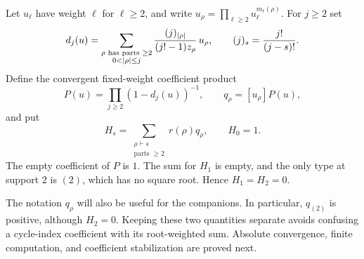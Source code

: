 Let $u_\ell$ have weight $\ell$ for $\ell\geq2$, and write $u_\rho=\prod_{\ell\geq2}u_\ell^{m_\ell(\rho)}$. For $j\geq2$ set
\begin{equation}\label{tks:eq:dj}
d_j(u)=\sum_{\substack{\rho\text{ has parts }\geq2\\0<|\rho|\leq j}}
 \frac{\fall{j}{|\rho|}}{(j!-1)z_\rho}\,u_\rho,
\qquad \fall{j}{s}=\frac{j!}{(j-s)!}.
\end{equation}
Define the convergent fixed-weight coefficient product
\begin{equation}\label{tks:eq:P}
P(u)=\prod_{j\geq2}(1-d_j(u))^{-1},\qquad
q_\rho=[u_\rho]P(u),
\end{equation}
and put
\begin{equation}\label{tks:eq:Hs}
H_s=\sum_{\substack{\rho\vdash s\\\text{parts }\geq2}}r(\rho)q_\rho,
\qquad H_0=1.
\end{equation}
The empty coefficient of $P$ is $1$. The sum for $H_1$ is empty, and the only type at support $2$ is $(2)$, which has no square root. Hence $H_1=H_2=0$.

The notation $q_\rho$ will also be useful for the companions. In particular, $q_{(2)}$ is positive, although $H_2=0$. Keeping these two quantities separate avoids confusing a cycle-index coefficient with its root-weighted sum. Absolute convergence, finite computation, and coefficient stabilization are proved next.
